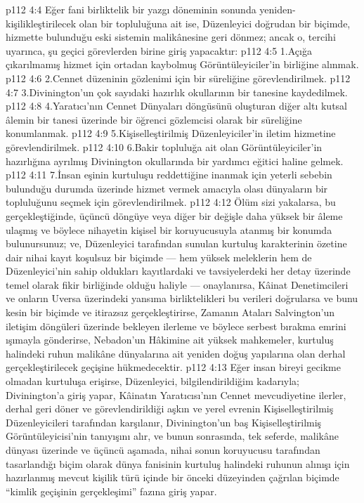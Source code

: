 \vs p112 4:4 Eğer fani birliktelik bir yazgı döneminin sonunda yeniden\hyp{}kişilikleştirilecek olan bir topluluğuna ait ise, Düzenleyici doğrudan bir biçimde, hizmette bulunduğu eski sistemin malikânesine geri dönmez; ancak o, tercihi uyarınca, şu geçici görevlerden birine giriş yapacaktır:
\vs p112 4:5 1.\bibnobreakspace Açığa çıkarılmamış hizmet için ortadan kaybolmuş Görüntüleyiciler’in birliğine alınmak.
\vs p112 4:6 2.\bibnobreakspace Cennet düzeninin gözlenimi için bir süreliğine görevlendirilmek.
\vs p112 4:7 3.\bibnobreakspace Divinington’un çok sayıdaki hazırlık okullarının bir tanesine kaydedilmek.
\vs p112 4:8 4.\bibnobreakspace Yaratıcı’nın Cennet Dünyaları döngüsünü oluşturan diğer altı kutsal âlemin bir tanesi üzerinde bir öğrenci gözlemcisi olarak bir süreliğine konumlanmak.
\vs p112 4:9 5.\bibnobreakspace Kişiselleştirilmiş Düzenleyiciler’in iletim hizmetine görevlendirilmek.
\vs p112 4:10 6.\bibnobreakspace Bakir topluluğa ait olan Görüntüleyiciler’in hazırlığına ayrılmış Divinington okullarında bir yardımcı eğitici haline gelmek.
\vs p112 4:11 7.\bibnobreakspace İnsan eşinin kurtuluşu reddettiğine inanmak için yeterli sebebin bulunduğu durumda üzerinde hizmet vermek amacıyla olası dünyaların bir topluluğunu seçmek için görevlendirilmek.
\vs p112 4:12 Ölüm sizi yakalarsa, bu gerçekleştiğinde, üçüncü döngüye veya diğer bir değişle daha yüksek bir âleme ulaşmış ve böylece nihayetin kişisel bir koruyucusuyla atanmış bir konumda bulunursunuz; ve, Düzenleyici tarafından sunulan kurtuluş karakterinin özetine dair nihai kayıt koşulsuz bir biçimde --- hem yüksek meleklerin hem de Düzenleyici’nin sahip oldukları kayıtlardaki ve tavsiyelerdeki her detay üzerinde temel olarak fikir birliğinde olduğu haliyle --- onaylanırsa, Kâinat Denetimcileri ve onların Uversa üzerindeki yansıma birliktelikleri bu verileri doğrularsa ve bunu kesin bir biçimde ve itirazsız gerçekleştirirse, Zamanın Ataları Salvington’un iletişim döngüleri üzerinde bekleyen ilerleme ve böylece serbest bırakma emrini ışımayla gönderirse, Nebadon’un Hâkimine ait yüksek mahkemeler, kurtuluş halindeki ruhun malikâne dünyalarına ait yeniden doğuş yapılarına olan derhal gerçekleştirilecek geçişine hükmedecektir.
\vs p112 4:13 Eğer insan bireyi gecikme olmadan kurtuluşa erişirse, Düzenleyici, bilgilendirildiğim kadarıyla; Divinington’a giriş yapar, Kâinatın Yaratıcısı’nın Cennet mevcudiyetine ilerler, derhal geri döner ve görevlendirildiği aşkın ve yerel evrenin Kişiselleştirilmiş Düzenleyicileri tarafından karşılanır, Divinington’un baş Kişiselleştirilmiş Görüntüleyicisi’nin tanıyışını alır, ve bunun sonrasında, tek seferde, malikâne dünyası üzerinde ve üçüncü aşamada, nihai sonun koruyucusu tarafından tasarlandığı biçim olarak dünya fanisinin kurtuluş halindeki ruhunun alınışı için hazırlanmış mevcut kişilik türü içinde bir önceki düzeyinden çağrılan biçimde “kimlik geçişinin gerçekleşimi” fazına giriş yapar.
